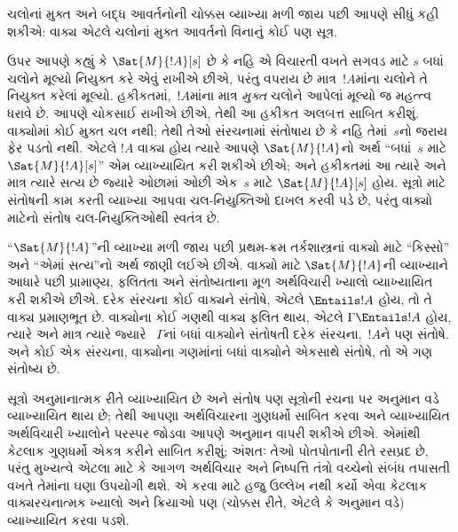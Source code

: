ચલોનાં મુક્ત અને બદ્ધ આવર્તનોની ચોક્કસ વ્યાખ્યા મળી જાય પછી આપણે
સીધું કહી શકીએ: વાક્ય એટલે ચલોનાં મુક્ત આવર્તનો
વિનાનું કોઈ પણ સૂત્ર.
\endgroup


\begingroup
\makeatletter{}\makeatother


\label{guunit:OLP-0145}


ઉપર આપણે કહ્યું કે $\Sat{M}{!A}[s]$ છે કે નહિ એ વિચારતી વખતે સગવડ
માટે $s$ બધાં ચલોને મૂલ્યો નિયુક્ત કરે એવું રાખીએ છીએ, પરંતુ
વપરાય છે માત્ર~$!A$માંના ચલોને તે નિયુક્ત કરેલાં મૂલ્યો.
હકીકતમાં,~$!A$માંના માત્ર \emph{મુક્ત} ચલોને આપેલાં મૂલ્યો જ મહત્ત્વ
ધરાવે છે. આપણે ચોકસાઈ રાખીએ છીએ, તેથી આ હકીકત અલબત્ત સાબિત કરીશું.
વાક્યોમાં કોઈ મુક્ત ચલ નથી; તેથી તેઓ સંરચનામાં સંતોષાય
છે કે નહિ તેમાં~$s$નો જરાય ફેર પડતો નથી. એટલે $!A$ વાક્ય હોય
ત્યારે આપણે $\Sat{M}{!A}$નો અર્થ ``બધાં~$s$ માટે
$\Sat{M}{!A}[s]$'' એમ વ્યાખ્યાયિત કરી શકીએ છીએ; અને હકીકતમાં આ ત્યારે
અને માત્ર ત્યારે સત્ય છે જ્યારે ઓછામાં ઓછી એક~$s$ માટે
$\Sat{M}{!A}[s]$ હોય. સૂત્રો માટે સંતોષની કામ કરતી વ્યાખ્યા
આપવા ચલ-નિયુક્તિઓ દાખલ કરવી પડે છે, પરંતુ વાક્યો
માટેનો સંતોષ ચલ-નિયુક્તિઓથી સ્વતંત્ર છે.

``$\Sat{M}{!A}$''ની વ્યાખ્યા મળી જાય પછી પ્રથમ-ક્રમ તર્કશાસ્ત્રનાં
વાક્યો માટે ``કિસ્સો'' અને ``એમાં સત્ય''નો અર્થ જાણી લઈએ છીએ.
વાક્યો માટે $\Sat{M}{!A}$ની વ્યાખ્યાને આધારે પછી પ્રામાણ્ય,
ફલિતતા અને સંતોષ્યતાના મૂળ અર્થવિચારી ખ્યાલો વ્યાખ્યાયિત કરી શકીએ
છીએ. દરેક સંરચના કોઈ વાક્યને સંતોષે, એટલે $\Entails !A$ હોય,
તો તે વાક્ય પ્રમાણભૂત છે. વાક્યોના કોઈ ગણથી વાક્ય ફલિત થાય,
એટલે $\Gamma \Entails !A$ હોય, ત્યારે અને માત્ર ત્યારે જ્યારે
~$\Gamma$નાં બધાં વાક્યોને સંતોષતી દરેક સંરચના,~$!A$ને
પણ સંતોષે. અને કોઈ એક સંરચના, વાક્યોના ગણમાંનાં બધાં
વાક્યોને એકસાથે સંતોષે, તો એ ગણ સંતોષ્ય છે.

સૂત્રો અનુમાનાત્મક રીતે વ્યાખ્યાયિત છે અને સંતોષ પણ
સૂત્રોની રચના પર અનુમાન વડે વ્યાખ્યાયિત થાય છે; તેથી આપણા
અર્થવિચારના ગુણધર્મો સાબિત કરવા અને વ્યાખ્યાયિત અર્થવિચારી ખ્યાલોને
પરસ્પર જોડવા આપણે અનુમાન વાપરી શકીએ છીએ. એમાંથી કેટલાક ગુણધર્મો
એકત્ર કરીને સાબિત કરીશું; અંશતઃ તેઓ પોતપોતાની રીતે રસપ્રદ છે, પરંતુ
મુખ્યત્વે એટલા માટે કે આગળ અર્થવિચાર અને નિષ્પત્તિ તંત્રો વચ્ચેનો
સંબંધ તપાસતી વખતે તેમાંના ઘણા ઉપયોગી થશે. એ કરવા માટે હજુ ઉલ્લેખ
નથી કર્યો એવા કેટલાક વાક્યરચનાત્મક ખ્યાલો અને ક્રિયાઓ પણ (ચોક્કસ
રીતે, એટલે કે અનુમાન વડે) વ્યાખ્યાયિત કરવા પડશે.
\endgroup


\begingroup
\makeatletter{}\makeatother

